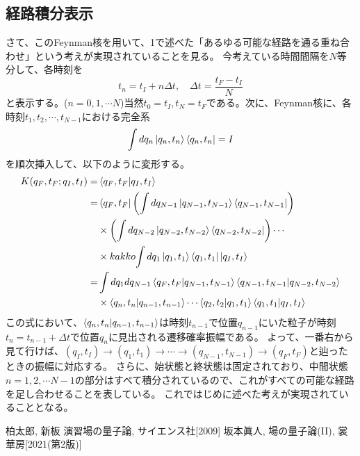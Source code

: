 \documentclass[10pt]{jsarticle}
\newcommand{\kakko}[1]{\left(#1 \right)} %
\numberwithin{equation}{section}%
\begin{document}
\subsection{経路積分表示}
さて、このFeynman核を用いて、1で述べた「あるゆる可能な経路を通る重ね合わせ」という考えが実現されていることを見る。
今考えている時間間隔を$N$等分して、各時刻を
\begin{equation}
  t_{n}=t_{I}+n\Delta t, \quad \Delta t=\frac{t_{F}-t_{I}}{N}
\end{equation}
と表示する。($n=0,1,\cdots N$)当然$t_{0}=t_{I},t_{N}=t_{F}$である。次に、Feynman核に、各時刻$t_{1},t_{2},\cdots ,t_{N-1}$における完全系
\begin{equation}
  \int dq_{n}\ket{q_{n},t_{n}}\bra{q_{n},t_{n}}=I
\end{equation}
を順次挿入して、以下のように変形する。
\begin{align}
  K(q_{F},t_{F};q_{I},t_{I})=& \braket{q_{F},t_{F}|q_{I},t_{I}}\\
  =& \bra{q_{F},t_{F}}\kakko{\int dq_{N-1}\ket{q_{N-1},t_{N-1}}\bra{q_{N-1},t_{N-1}}} \\
  & \times \kakko{\int dq_{N-2}\ket{q_{N-2},t_{N-2}}\bra{q_{N-2},t_{N-2}}}\cdots\\\
  & \times kakko{\int dq_{1}\ket{q_{1},t_{1}}\bra{q_{1},t_{1}}} \ket{q_{I},t_{I}}\\
  =& \int dq_{1}dq_{N-1}\braket{q_{F},t_{F}|q_{N-1},t_{N-1}}\braket{q_{N-1},t_{N-1}|q_{N-2},t_{N-2}}\\
 &\times \braket{q_{n},t_{n}|q_{n-1},t_{n-1}} \cdots \braket{q_{2},t_{2}|q_{1},t_{1}}\braket{q_{1},t_{1}|q_{I},t_{I}}
\end{align}
この式において、$\braket{q_{n},t_{n}|q_{n-1},t_{n-1}}$は時刻$t_{n-1}$で位置$q_{n-1}$にいた粒子が時刻$t_{n}=t_{n-1}+\Delta t$で位置$q_{n}$に見出される遷移確率振幅である。
よって、一番右から見て行けば、$(q_{I},t_{I})\to(q_{1},t_{1})\to \cdots \to (q_{N-1},t_{N-1})\to (q_{F},t_{F})$と辿ったときの振幅に対応する。
さらに、始状態と終状態は固定されており、中間状態$n=1,2,\cdots N-1$の部分はすべて積分されているので、これがすべての可能な経路を足し合わせることを表している。
これではじめに述べた考えが実現されていることとなる。
\begin{thebibliography}{99}
   柏太郎, 新板 演習場の量子論, サイエンス社[2009]   
   坂本眞人, 場の量子論(II), 裳華房[2021(第2版)]   
\end{thebibliography}
\end{document}
